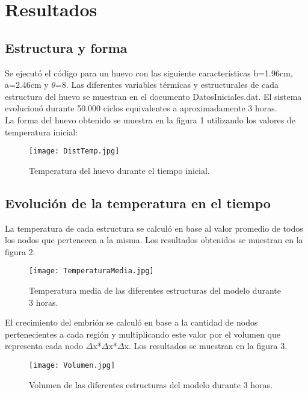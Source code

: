 \documentclass{article}
\begin{document}
	
	\section{Resultados}
	
	\subsection{Estructura y forma}
	
	Se ejecutó el código para un huevo con las siguiente características b=1.96cm, a=2.46cm y \(\theta\)=8. Las diferentes variables térmicas y estructurales de cada estructura del huevo se muestran en el documento DatosIniciales.dat. El sistema evolucionó durante 50.000 ciclos equivalentes a aproximadamente 3 horas.\\
	
	La forma del huevo obtenido se muestra en la figura 1 utilizando los valores de temperatura inicial:\\
	
	\begin{figure}
		\centering
		\texttt{[image: DistTemp.jpg]}
		\caption{Temperatura del huevo durante el tiempo inicial.}
	\end{figure}


	\subsection{Evolución de la temperatura en el tiempo}
	
	La temperatura de cada estructura se calculó en base al valor promedio de todos los nodos que pertenecen a la misma. Los resultados obtenidos se muestran en la figura 2.
	
	\begin{figure}
		\centering
		\texttt{[image: TemperaturaMedia.jpg]}
		\caption{Temperatura media de las diferentes estructuras del modelo durante 3 horas.}
	\end{figure}

	El crecimiento del embrión se calculó en base a la cantidad de nodos pertenecientes a cada región y multiplicando este valor por el volumen que representa cada nodo \(\Delta\)x*\(\Delta\)x*\(\Delta\)x. Los resultados se muestran en la figura 3.
	
	\begin{figure}
		\centering
		\texttt{[image: Volumen.jpg]}
		\caption{Volumen de las diferentes estructuras del modelo durante 3 horas.}
	\end{figure}
	
\end{document}
